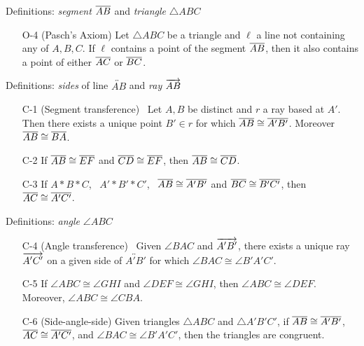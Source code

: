 \begin{minipage}[t]{0.46\linewidth}
Definitions: \emph{segment} $\overline{AB}$ and \emph{triangle} $\triangle ABC$\vspace{-2pt}

\begin{enumerate}\setcounter{enumi}{3}	
	\item[O-4] (Pasch's Axiom) Let $\triangle ABC$ be a triangle and $\ell$ a line not containing any of $A,B,C$. If $\ell$ contains a point of the segment $\overline{AB}$, then it also contains a point of either $\overline{AC}$ or $\overline{BC}$. 
\end{enumerate}

Definitions: \emph{sides} of line $\overleftrightarrow{AB}$ and \emph{ray} $\overrightarrow{AB}$
\end{minipage}
\hfill
\begin{minipage}[t]{0.48\linewidth}

\begin{enumerate}
  \item[C-1] (Segment transference) \ Let $A,B$ be distinct and $r$ a ray based at $A'$. Then there exists a unique point $B'\in r$ for which $\overline{AB}\cong\overline{A'B'}$. Moreover $\overline{AB}\cong\overline{BA}$.
  \item[C-2] If $\overline{AB}\cong\overline{EF}$ and $\overline{CD}\cong\overline{EF}$, then $\overline{AB}\cong\overline{CD}$.
  \item[C-3] If $A*B*C$, \ $A'*B'*C'$, \ $\overline{AB}\cong\overline{A'B'}$ and $\overline{BC}\cong\overline{B'C'}$, then $\overline{AC}\cong\overline{A'C'}$.
  \end{enumerate}
	
Definitions: \emph{angle} $\angle ABC$\vspace{-2pt}

\begin{enumerate}\setcounter{enumi}{3}
  \item[C-4] (Angle transference) \ Given $\angle BAC$ and $\overrightarrow{A'B'}$, there exists a unique ray $\overrightarrow{A'C'}$ on a given side of $\overleftrightarrow{A'B'}$ for which $\angle BAC\cong\angle B'A'C'$.
  \item[C-5] If $\angle ABC\cong\angle GHI$ and $\angle DEF\cong\angle GHI$, then $\angle ABC\cong\angle DEF$. Moreover, $\angle ABC\cong\angle CBA$.
  \item[C-6] (Side-angle-side) Given triangles $\triangle ABC$ and $\triangle A'B'C'$, if $\overline{AB}\cong\overline{A'B'}$, $\overline{AC}\cong\overline{A'C'}$, and $\angle BAC\cong\angle B'A'C'$, then the triangles are congruent.\footnotemark{}
\end{enumerate}


\end{minipage}
